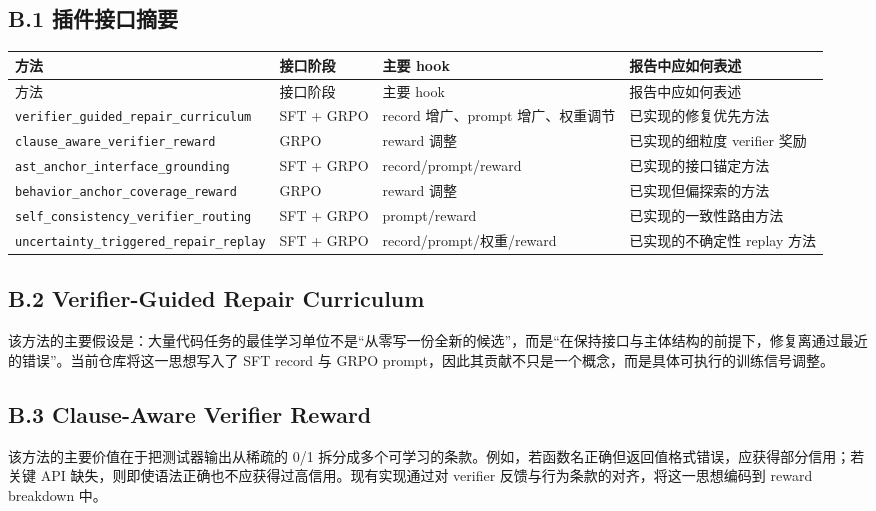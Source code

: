 \documentclass[11pt,a4paper]{article}
\newcommand{\code}[1]{\begingroup\ttfamily\footnotesize\nolinkurl{#1}\endgroup}
\begin{document}
\subsection{B.1 插件接口摘要}

\small
\begin{longtable}{p{3.0cm} p{2.3cm} p{2.8cm} p{5.2cm}}
\toprule
方法 & 接口阶段 & 主要 hook & 报告中应如何表述 \\
\midrule
\endfirsthead
\toprule
方法 & 接口阶段 & 主要 hook & 报告中应如何表述 \\
\midrule
\endhead
\code{verifier_guided_repair_curriculum} & SFT + GRPO & record 增广、prompt 增广、权重调节 & 已实现的修复优先方法 \\
\code{clause_aware_verifier_reward} & GRPO & reward 调整 & 已实现的细粒度 verifier 奖励 \\
\code{ast_anchor_interface_grounding} & SFT + GRPO & record/prompt/reward & 已实现的接口锚定方法 \\
\code{behavior_anchor_coverage_reward} & GRPO & reward 调整 & 已实现但偏探索的方法 \\
\code{self_consistency_verifier_routing} & SFT + GRPO & prompt/reward & 已实现的一致性路由方法 \\
\code{uncertainty_triggered_repair_replay} & SFT + GRPO & record/prompt/权重/reward & 已实现的不确定性 replay 方法 \\
\bottomrule
\end{longtable}
\normalsize

\subsection{B.2 Verifier-Guided Repair Curriculum}

该方法的主要假设是：大量代码任务的最佳学习单位不是“从零写一份全新的候选”，而是“在保持接口与主体结构的前提下，修复离通过最近的错误”。当前仓库将这一思想写入了 SFT record 与 GRPO prompt，因此其贡献不只是一个概念，而是具体可执行的训练信号调整。

\subsection{B.3 Clause-Aware Verifier Reward}

该方法的主要价值在于把测试器输出从稀疏的 0/1 拆分成多个可学习的条款。例如，若函数名正确但返回值格式错误，应获得部分信用；若关键 API 缺失，则即使语法正确也不应获得过高信用。现有实现通过对 verifier 反馈与行为条款的对齐，将这一思想编码到 reward breakdown 中。
\end{document}
